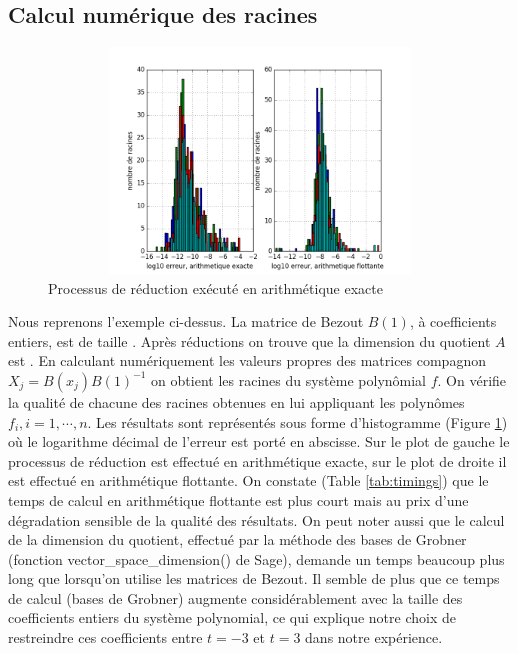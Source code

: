 \documentclass{standalone}
\begin{document}
  \subsection{Calcul numérique des racines}

\begin{figure}[h]
    \caption{Processus de réduction exécuté en arithmétique exacte}
  \label{fig:roots}
  \includegraphics[width=15cm, height=6cm]{../png/roots.png}
\end{figure}
  Nous reprenons l'exemple ci-dessus. La matrice de Bezout $B(1)$, à coefficients entiers, est de taille . Après réductions on trouve que la dimension du quotient $A$ est . En calculant numériquement les valeurs propres des matrices compagnon $X_j = B(x_j)B(1)^{-1}$ on obtient les racines du système polynômial $f$. On vérifie la qualité de chacune des racines obtenues en lui appliquant les polynômes $f_i, i=1,\cdots,n$. Les résultats sont représentés sous forme d'histogramme (Figure \ref{fig:roots}) o\`u le logarithme décimal de l'erreur est porté en abscisse. Sur le plot de gauche le processus de réduction est effectué en arithmétique exacte, sur le plot de droite il est effectué en arithmétique flottante. On constate (Table \ref{tab:timings}) que le temps de calcul en arithmétique flottante est plus court mais au prix d'une dégradation sensible de la qualité des résultats. On peut noter aussi que le calcul de la dimension du quotient, effectué par la méthode des bases de Grobner (fonction vector\_space\_dimension() de Sage), demande un temps beaucoup
plus long que lorsqu'on utilise les matrices de Bezout. Il semble de plus que ce temps de calcul (bases de Grobner) augmente considérablement avec la taille des coefficients entiers du système polynomial, ce qui explique notre choix de restreindre ces coefficients entre $t=-3$ et $t=3$ dans notre expérience.
\end{document}
